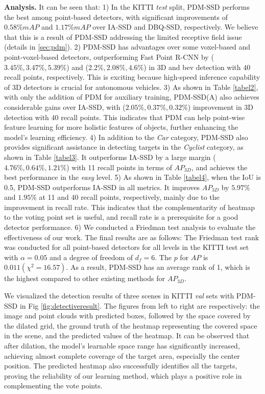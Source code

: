 \textbf{Analysis.} It can be seen that: 
1) In the KITTI \textit{test} split, PDM-SSD performs the best among point-based detectors, with significant improvements of $0.58\% mAP$ and $1.17\% mAP$ over IA-SSD and DBQ-SSD, respectively. We believe that this is a result of PDM-SSD addressing the limited receptive field issue (details in \ref{sec:pdm}). 
2) PDM-SSD has advantages over some voxel-based and point-voxel-based detectors, outperforming Fast Point R-CNN by ($3.45\%, 3.47\%, 5.39\%$) and ($2.2\%, 2.08\%, 4.6\%$) in 3D and bev detection with 40 recall points, respectively. This is exciting because high-speed inference capability of 3D detectors is crucial for autonomous vehicles. 
3) As shown in Table \ref{tabel2}, with only the addition of PDM for auxiliary training, PDM-SSD(A) also achieves considerable gains over IA-SSD, with ($2.05\%, 0.37\%, 0.32\%$) improvement in 3D detection with 40 recall points. This indicates that PDM can help point-wise feature learning for more holistic features of objects, further enhancing the model's learning efficiency. 
4) In addition to the \textit{Car} category, PDM-SSD also provides significant assistance in detecting targets in the \textit{Cyclist} category, as shown in Table \ref{tabel3}. It outperforms IA-SSD by a large margin ($4.76\%, 0.64\%, 1.21\%$) with 11 recall points in terms of $AP_{3D}$, and achieves the best performance in the \textit{easy} level. 
5) As shown in Table \ref{tabel4}, when the IoU is 0.5, PDM-SSD outperforms IA-SSD in all metrics. It improves $AP_{3D}$ by $5.97\%$ and $1.95\%$ at 11 and 40 recall points, respectively, mainly due to the improvement in recall rate. This indicates that the complementarity of heatmap to the voting point set is useful, and recall rate is a prerequisite for a good detector performance. 
6) We conducted a Friedman test analysis \cite{jamaludin2022novel} to evaluate the effectiveness of our work. The final results are as follows: The Friedman test rank was conducted for all point-based detectors for all levels in the KITTI test set with $\alpha = 0.05$ and a degree of freedom of $d_f = 6$. The $p$ for $AP$ is $0.011 (\chi^2 = 16.57)$. As a result, PDM-SSD has an average rank of 1, which is the highest compared to other existing methods for $AP_{3D}$.

We visualized the detection results of three scenes in KITTI \textit{val} sets with PDM-SSD in Fig \ref{fig:detectiveresult}. The figures from left to right are respectively: the image and point clouds with predicted boxes, followed by the space covered by the dilated grid, the ground truth of the heatmap representing the covered space in the scene, and the predicted values of the heatmap. It can be observed that after dilation, the model's learnable space range has significantly increased, achieving almost complete coverage of the target area, especially the center position. The predicted heatmap also successfully identifies all the targets, proving the reliability of our learning method, which plays a positive role in complementing the vote points.


